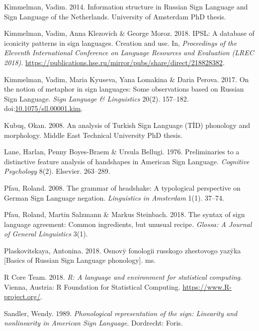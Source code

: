 \leavevmode\hypertarget{ref-Kimmelman:2014}{}%
Kimmelman, Vadim. 2014. Information structure in Russian Sign Language
and Sign Language of the Netherlands. University of Amsterdam
PhD thesis.

\leavevmode\hypertarget{ref-Kimmelman:2018}{}%
Kimmelman, Vadim, Anna Klezovich \& George Moroz. 2018. IPSL: A database
of iconicity patterns in sign languages. Creation and use. In,
\emph{Proceedings of the Eleventh International Conference on Language
Resources and Evaluation (LREC 2018)}.
\url{https://publications.hse.ru/mirror/pubs/share/direct/218828382}.

\leavevmode\hypertarget{ref-Kimmelman:2017}{}%
Kimmelman, Vadim, Maria Kyuseva, Yana Lomakina \& Daria Perova. 2017. On
the notion of metaphor in sign languages: Some observations based on
Russian Sign Language. \emph{Sign Language \& Linguistics} 20(2).
157--182.
doi:\href{https://doi.org/10.1075/sll.00001.kim}{10.1075/sll.00001.kim}.

\leavevmode\hypertarget{ref-Kubucs:2008}{}%
Kubuş, Okan. 2008. An analysis of Turkish Sign Language (TİD) phonology
and morphology. Middle East Technical University PhD thesis.

\leavevmode\hypertarget{ref-Lane:1976}{}%
Lane, Harlan, Penny Boyes-Braem \& Ursula Bellugi. 1976. Preliminaries
to a distinctive feature analysis of handshapes in American Sign
Language. \emph{Cognitive Psychology} 8(2). Elsevier. 263--289.

\leavevmode\hypertarget{ref-Pfau:2008}{}%
Pfau, Roland. 2008. The grammar of headshake: A typological perspective
on German Sign Language negation. \emph{Linguistics in Amsterdam} 1(1).
37--74.

\leavevmode\hypertarget{ref-Pfau:2018}{}%
Pfau, Roland, Martin Salzmann \& Markus Steinbach. 2018. The syntax of
sign language agreement: Common ingredients, but unusual recipe.
\emph{Glossa: A Journal of General Linguistics} 3(1).

\leavevmode\hypertarget{ref-Plaskovitskaya:2018}{}%
Plaskovitskaya, Antonina. 2018. Osnovȳ fonologii russkogo zhestovogo
yazȳka {[}Basics of Russian Sign Language phonology{]}. ms.

\leavevmode\hypertarget{ref-R:2018}{}%
R Core Team. 2018. \emph{R: A language and environment for statistical
computing}. Vienna, Austria: R Foundation for Statistical Computing.
\url{https://www.R-project.org/}.

\leavevmode\hypertarget{ref-Sandler:1989}{}%
Sandler, Wendy. 1989. \emph{Phonological representation of the sign:
Linearity and nonlinearity in American Sign Language}. Dordrecht: Foris.

